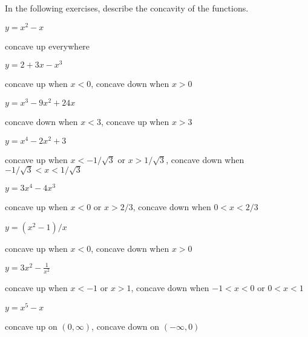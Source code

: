 \begin{exercises}
\noindent In the following exercises, describe the concavity of the functions.

\twocol

\begin{exercise} $y=x^2-x$ 
\begin{answer} concave up everywhere
\end{answer}\end{exercise}

\begin{exercise} $y=2+3x-x^3$ 
\begin{answer} concave up when $x<0$, concave down when $x>0$
\end{answer}\end{exercise}

\begin{exercise} $y=x^3-9x^2+24x$
\begin{answer} concave down when $x<3$, concave up when $x>3$
\end{answer}\end{exercise}

\begin{exercise} $y=x^4-2x^2+3$ 
\begin{answer} concave up when $x<-1/\sqrt3$ or $x>1/\sqrt3$,
concave down when $-1/\sqrt3<x<1/\sqrt3$
\end{answer}\end{exercise}

\begin{exercise} $y=3x^4-4x^3$
\begin{answer} concave up when $x<0$ or $x>2/3$,
concave down when $0<x<2/3$
\end{answer}\end{exercise}

\begin{exercise} $y=(x^2-1)/x$
\begin{answer} concave up when $x<0$, concave down when $x>0$
\end{answer}\end{exercise}

\begin{exercise} $y=3x^2-\frac{1}{x^2}$ 
\begin{answer} concave up when $x<-1$ or $x>1$, concave down when
$-1<x<0$ or $0<x<1$
\end{answer}\end{exercise}

\begin{exercise} $y= x^5 - x$
\begin{answer} concave up on $(0,\infty)$, concave down on $(-\infty,0)$
\end{answer}\end{exercise}


\end{exercises}
